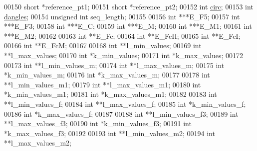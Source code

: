 \begin{DoxyCode}
00150   \textcolor{keywordtype}{short}           *reference\_pt1;
00151   \textcolor{keywordtype}{short}           *reference\_pt2;
00152   \textcolor{keywordtype}{int}             \hyperlink{group__model__details_gaf9202a1a09f5828dc731e2d9a10fa111}{circ};
00153   \textcolor{keywordtype}{int}             \hyperlink{group__model__details_ga72b511ed1201f7e23ec437e468790d74}{dangles};
00154   \textcolor{keywordtype}{unsigned} \textcolor{keywordtype}{int}    seq\_length;
00155 
00156   \textcolor{keywordtype}{int}             ***E\_F5;
00157   \textcolor{keywordtype}{int}             ***E\_F3;
00158   \textcolor{keywordtype}{int}             ***E\_C;
00159   \textcolor{keywordtype}{int}             ***E\_M;
00160   \textcolor{keywordtype}{int}             ***E\_M1;
00161   \textcolor{keywordtype}{int}             ***E\_M2;
00162 
00163   \textcolor{keywordtype}{int}             **E\_Fc;
00164   \textcolor{keywordtype}{int}             **E\_FcH;
00165   \textcolor{keywordtype}{int}             **E\_FcI;
00166   \textcolor{keywordtype}{int}             **E\_FcM;
00167 
00168   \textcolor{keywordtype}{int}             **l\_min\_values;
00169   \textcolor{keywordtype}{int}             **l\_max\_values;
00170   \textcolor{keywordtype}{int}             *k\_min\_values;
00171   \textcolor{keywordtype}{int}             *k\_max\_values;
00172 
00173   \textcolor{keywordtype}{int}             **l\_min\_values\_m;
00174   \textcolor{keywordtype}{int}             **l\_max\_values\_m;
00175   \textcolor{keywordtype}{int}             *k\_min\_values\_m;
00176   \textcolor{keywordtype}{int}             *k\_max\_values\_m;
00177 
00178   \textcolor{keywordtype}{int}             **l\_min\_values\_m1;
00179   \textcolor{keywordtype}{int}             **l\_max\_values\_m1;
00180   \textcolor{keywordtype}{int}             *k\_min\_values\_m1;
00181   \textcolor{keywordtype}{int}             *k\_max\_values\_m1;
00182 
00183   \textcolor{keywordtype}{int}             **l\_min\_values\_f;
00184   \textcolor{keywordtype}{int}             **l\_max\_values\_f;
00185   \textcolor{keywordtype}{int}             *k\_min\_values\_f;
00186   \textcolor{keywordtype}{int}             *k\_max\_values\_f;
00187 
00188   \textcolor{keywordtype}{int}             **l\_min\_values\_f3;
00189   \textcolor{keywordtype}{int}             **l\_max\_values\_f3;
00190   \textcolor{keywordtype}{int}             *k\_min\_values\_f3;
00191   \textcolor{keywordtype}{int}             *k\_max\_values\_f3;
00192 
00193   \textcolor{keywordtype}{int}             **l\_min\_values\_m2;
00194   \textcolor{keywordtype}{int}             **l\_max\_values\_m2;

\end{DoxyCode}
